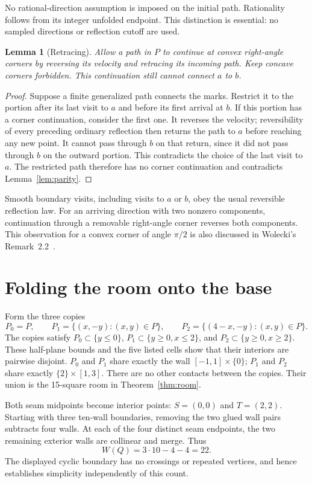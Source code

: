 \documentclass[11pt]{article}
\newtheorem{lemma}[theorem]{Lemma}
\theoremstyle{definition}\newtheorem{definition}[theorem]{Definition}
\begin{document}
No rational-direction assumption is imposed on the initial path. Rationality follows from its integer unfolded endpoint. This distinction is essential: no sampled directions or reflection cutoff are used.

\begin{lemma}[Retracing]\label{lem:retrace}
Allow a path in $P$ to continue at convex right-angle corners by reversing its velocity and retracing its incoming path. Keep concave corners forbidden. This continuation still cannot connect $a$ to $b$.
\end{lemma}
\begin{proof}
Suppose a finite generalized path connects the marks. Restrict it to the portion after its last visit to $a$ and before its first arrival at $b$. If this portion has a corner continuation, consider the first one. It reverses the velocity; reversibility of every preceding ordinary reflection then returns the path to $a$ before reaching any new point. It cannot pass through $b$ on that return, since it did not pass through $b$ on the outward portion. This contradicts the choice of the last visit to $a$. The restricted path therefore has no corner continuation and contradicts Lemma~\ref{lem:parity}.
\end{proof}

Smooth boundary visits, including visits to $a$ or $b$, obey the usual reversible reflection law. For an arriving direction with two nonzero components, continuation through a removable right-angle corner reverses both components. This observation for a convex corner of angle $\pi/2$ is also discussed in Wolecki's Remark~2.2~\cite{wolecki}.

\section{Folding the room onto the base}
Form the three copies
\[
 P_0=P,\qquad P_1=\{(x,-y):(x,y)\in P\},\qquad
 P_2=\{(4-x,-y):(x,y)\in P\}.
\]
The copies satisfy $P_0\subset\{y\le0\}$, $P_1\subset\{y\ge0,x\le2\}$, and $P_2\subset\{y\ge0,x\ge2\}$. These half-plane bounds and the five listed cells show that their interiors are pairwise disjoint. $P_0$ and $P_1$ share exactly the wall $[-1,1]\times\{0\}$; $P_1$ and $P_2$ share exactly $\{2\}\times[1,3]$. There are no other contacts between the copies. Their union is the 15-square room in Theorem~\ref{thm:room}.

Both seam midpoints become interior points: $S=(0,0)$ and $T=(2,2)$. Starting with three ten-wall boundaries, removing the two glued wall pairs subtracts four walls. At each of the four distinct seam endpoints, the two remaining exterior walls are collinear and merge. Thus
\[
 W(Q)=3\cdot10-4-4=22.
\]
The displayed cyclic boundary has no crossings or repeated vertices, and hence establishes simplicity independently of this count.
\end{document}
